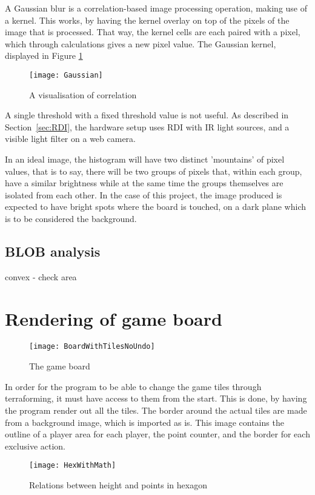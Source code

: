A Gaussian blur is a correlation-based image processing operation, making use of a kernel. This works, by having the kernel overlay on top of the pixels of the image that is processed. That way, the kernel cells are each paired with a pixel, which through calculations gives a new pixel value. The Gaussian kernel, displayed in Figure \ref{Fig:Gaussian} 

\begin{figure}[h!]
\centering \texttt{[image: Gaussian]}
\caption{A visualisation of correlation \label{Fig:Gaussian}\citep{moeslund_introduction_2012}}
\end{figure}

A single threshold with a fixed threshold value is not useful. As described in Section~\ref{sec:RDI}, the hardware setup uses RDI with IR light sources, and a visible light filter on a web camera. 
 
 
 
 
In an ideal image, the histogram will have two distinct 'mountains' of pixel values, that is to say, there will be two groups of pixels that, within each group, have a similar brightness while at the same time the groups themselves are isolated from each other. In the case of this project, the image produced is expected to have bright spots where the board is touched, on a dark plane which is to be considered the background.
 
 
 

\subsection{BLOB analysis}
convex - check area




\section{Rendering of game board}
\begin{figure}[h!]
\centering \texttt{[image: BoardWithTilesNoUndo]}
\caption{The game board \label{Fig:Board}}
\end{figure}
In order for the program to be able to change the game tiles through terraforming, it must have access to them from the start. This is done, by having the program render out all the tiles. The border around the actual tiles are made from a background image, which is imported as is. This image contains the outline of a player area for each player, the point counter, and the border for each exclusive action. 
\begin{figure}[h!]
\centering \texttt{[image: HexWithMath]}
\caption{Relations between height and points in hexagon \label{Fig:HexWithMath}}
\end{figure}

